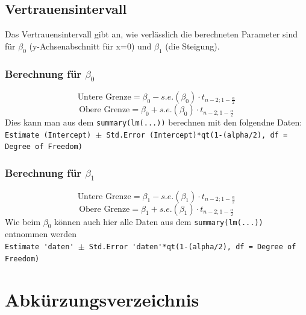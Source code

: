 \subsection{Vertrauensintervall}
Das Vertrauensintervall gibt an, wie verlässlich die berechneten Parameter
sind für $\beta_0$ (y-Achsenabschnitt für x=0) und $\beta_1$ (die Steigung).
\subsubsection{Berechnung für $\beta_0$}
\[ \text{Untere Grenze} = \beta_0 - s.e.(\beta_0)\cdot t_{n-2;1-\frac{\alpha}{2}} \]
\[ \text{Obere Grenze} = \beta_0 + s.e.(\beta_0)\cdot t_{n-2;1-\frac{\alpha}{2}} \]
Dies kann man aus dem \verb!summary(lm(...))! berechnen mit den folgendne Daten:\\
\verb!Estimate (Intercept) !$\pm$\verb! Std.Error (Intercept)*qt(1-(alpha/2), df = Degree of Freedom)!
\subsubsection{Berechnung für $\beta_1$}
\[ \text{Untere Grenze} = \beta_1 - s.e.(\beta_1)\cdot t_{n-2;1-\frac{\alpha}{2}} \]
\[ \text{Obere Grenze} = \beta_1 + s.e.(\beta_1)\cdot t_{n-2;1-\frac{\alpha}{2}} \]
Wie beim $\beta_0$ können auch hier alle Daten aus dem 
\verb!summary(lm(...))! entnommen werden\\
\verb!Estimate 'daten' !$\pm$\verb! Std.Error 'daten'*qt(1-(alpha/2), df = Degree of Freedom)!



\section{Abkürzungsverzeichnis}
\begin{acronym}[SQL]
\end{acronym}


